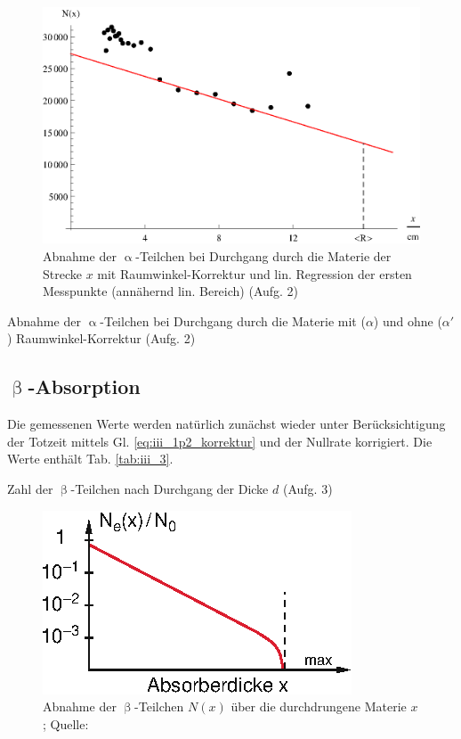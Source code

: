 \begin{figure}[ht]
\centering
\includegraphics[scale=1.0]{fig/iii_2_plotb.eps}
\caption{Abnahme der $\upalpha$-Teilchen bei Durchgang durch die Materie der Strecke $x$ mit Raumwinkel-Korrektur und lin. Regression der ersten Messpunkte (annähernd lin. Bereich) (Aufg. 2)}
\label{fig:iii_2_plotb}
\end{figure}

\begin{table}[ht]
\centering
\caption{Abnahme der $\upalpha$-Teilchen bei Durchgang durch die Materie mit ($\alpha$) und ohne ($\alpha'$) Raumwinkel-Korrektur (Aufg. 2)}
\label{tab:iii_2}



\end{table}

\subsection{\texorpdfstring{$\upbeta$}{Beta}-Absorption}
Die gemessenen Werte werden natürlich zunächst wieder unter Berücksichtigung der Totzeit mittels Gl. \eqref{eq:iii_1p2_korrektur} und der Nullrate korrigiert. Die Werte enthält Tab. \ref{tab:iii_3}.

\begin{table}[ht]
\centering
\caption{Zahl der $\upbeta$-Teilchen nach Durchgang der Dicke $d$ (Aufg. 3)}
\label{tab:iii_3}


\end{table}

\begin{figure}[ht]
\centering
\includegraphics[scale=1.5]{fig/iii_3_dem.eps}
\caption{Abnahme der $\upbeta$-Teilchen $N(x)$ über die durchdrungene Materie $x$; Quelle: \cite[S. 92]{Dem10}}
\label{fig:iii_3_dem}
\end{figure}

